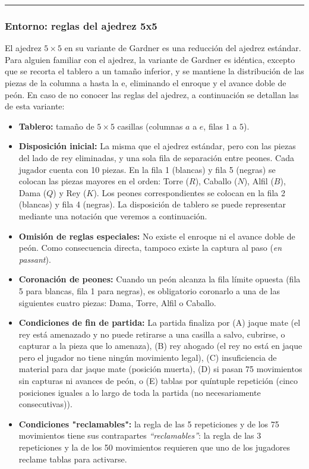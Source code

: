 \documentclass[12pt, a4paper]{article}
\begin{document}
\rule{\textwidth}{0.2pt}
\subsubsection{Entorno: reglas del ajedrez 5x5} \label{sec:reglas_gardner}

El ajedrez $5\times5$ en su variante de Gardner es una reducción del ajedrez estándar. Para alguien familiar con el ajedrez, la variante de Gardner es idéntica, excepto que se recorta el tablero a un tamaño inferior, y se mantiene la distribución de las piezas de la columna a hasta la e, eliminando el enroque y el avance doble de peón. 
En caso de no conocer las reglas del ajedrez, a continuación se detallan las de esta variante:
\begin{itemize}
    \item \textbf{Tablero:} tamaño de $5\times5$ casillas (columnas $a$ a $e$, filas $1$ a $5$).
    \item \textbf{Disposición inicial:} La misma que el ajedrez estándar, pero con las piezas del lado de rey eliminadas, y una sola fila de separación entre peones. Cada jugador cuenta con 10 piezas. En la fila 1 (blancas) y fila 5 (negras) se colocan las piezas mayores en el orden: Torre ($R$), Caballo ($N$), Alfil ($B$), Dama ($Q$) y Rey ($K$). Los peones correspondientes se colocan en la fila 2 (blancas) y fila 4 (negras). La disposición de tablero se puede representar mediante una notación que veremos a continuación.
    \item \textbf{Omisión de reglas especiales:} No existe el enroque ni el avance doble de peón. Como consecuencia directa, tampoco existe la captura al paso (\textit{en passant}).
    \item \textbf{Coronación de peones:} Cuando un peón alcanza la fila límite opuesta (fila 5 para blancas, fila 1 para negras), es obligatorio coronarlo a una de las siguientes cuatro piezas: Dama, Torre, Alfil o Caballo.
    \item \textbf{Condiciones de fin de partida:} La partida finaliza por (A) jaque mate (el rey está amenazado y no puede retirarse a una casilla a salvo, cubrirse, o capturar a la pieza que lo amenaza), (B) rey ahogado (el rey no está en jaque pero el jugador no tiene ningún movimiento legal), (C) insuficiencia de material para dar jaque mate (posición muerta), (D) si pasan 75 movimientos sin capturas ni avances de peón, o (E) tablas por quíntuple repetición (cinco posiciones iguales a lo largo de toda la partida (no necesariamente consecutivas)).
    \item \textbf{Condiciones "reclamables":} la regla de las 5 repeticiones y de los 75 movimientos tiene sus contrapartes \textit{``reclamables''}: la regla de las 3 repeticiones y la de los 50 movimientos requieren que uno de los jugadores reclame tablas para activarse.
\end{itemize}
\end{document}
